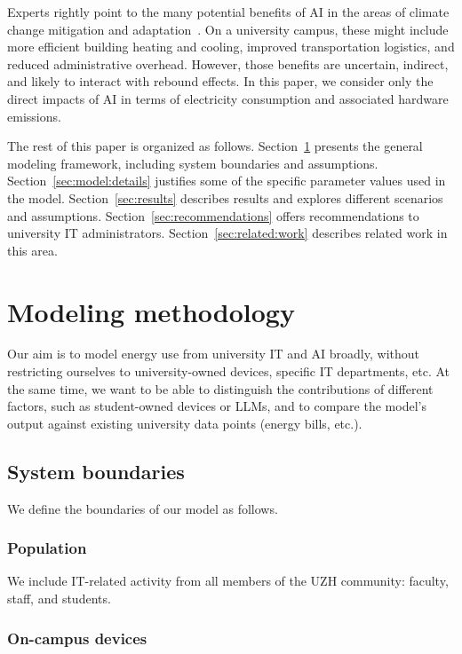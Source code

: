 \documentclass[11pt]{article}
\let\cite\parencite
\begin{document}
Experts rightly point to the many potential benefits of AI in the areas of
climate change mitigation and adaptation~\cite{climate:change:ai}. On a
university campus, these might include more efficient building heating and
cooling, improved transportation logistics, and reduced administrative overhead.
However, those benefits are uncertain, indirect, and likely to interact with
rebound effects. In this paper, we consider only the direct impacts of AI
in terms of electricity consumption and associated hardware emissions.

The rest of this paper is organized as follows.
Section~\ref{sec:model:methodology} presents the general modeling framework,
including system boundaries and assumptions. Section~\ref{sec:model:details}
justifies some of the specific parameter values used in the model.
Section~\ref{sec:results} describes results and explores different scenarios and
assumptions. Section~\ref{sec:recommendations} offers recommendations to
university IT administrators. Section~\ref{sec:related:work} describes related
work in this area.

\section{Modeling methodology}
\label{sec:model:methodology}

Our aim is to model energy use from university IT and AI broadly, without
restricting ourselves to university-owned devices, specific IT departments, etc.
At the same time, we want to be able to distinguish the contributions of
different factors, such as student-owned devices or LLMs, and to compare the
model's output against existing university data points (energy bills, etc.).

\subsection{System boundaries}

We define the boundaries of our model as follows.

\subsubsection*{Population}

We include IT-related activity from all members of the UZH community: faculty,
staff, and students.

\subsubsection*{On-campus devices}
\end{document}

